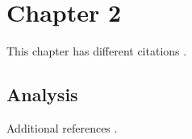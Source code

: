 
\section{Chapter 2}

This chapter has different citations \cite{brown2021}.

\subsection{Analysis}

Additional references \cite{white2018,black2022}.

